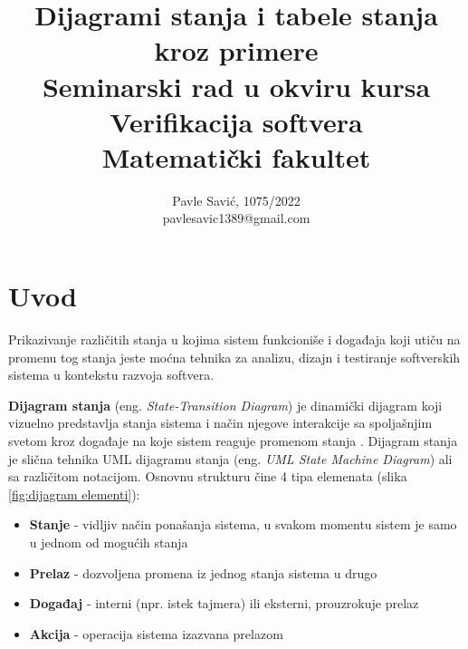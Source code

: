 \documentclass[a4paper]{article}
\begin{document}
\title{Dijagrami stanja i tabele stanja kroz primere\\ \small{Seminarski rad u okviru kursa\\Verifikacija softvera\\Matematički fakultet}}

\author{Pavle Savić, 1075/2022\\ pavlesavic1389@gmail.com}
\maketitle


\tableofcontents

\newpage

\section{Uvod}
\label{sec:uvod} Prikazivanje različitih stanja u kojima sistem funkcioniše i događaja koji utiču na promenu tog stanja jeste moćna tehnika za analizu, dizajn i testiranje softverskih sistema u kontekstu razvoja softvera. 

\textbf{Dijagram stanja} (eng. \textit{State-Transition Diagram}) je dinamički dijagram koji vizuelno predstavlja stanja sistema i način njegove interakcije sa spoljašnjim svetom kroz događaje na koje sistem reaguje promenom stanja \cite{StateTestingExample}. Dijagram stanja je slična tehnika UML dijagramu stanja (eng. \textit{UML State Machine Diagram}) ali sa različitom notacijom. Osnovnu strukturu čine 4 tipa elemenata (slika \ref{fig:dijagram elementi}):

\begin{itemize}
    \item \textbf{Stanje} - vidljiv način ponašanja sistema, u svakom momentu sistem je samo u jednom od mogućih stanja  
    \item \textbf{Prelaz} - dozvoljena promena iz jednog stanja sistema u drugo
    \item \textbf{Događaj} - interni (npr. istek tajmera) ili eksterni, prouzrokuje prelaz 
    \item \textbf{Akcija} - operacija sistema izazvana prelazom
\end{itemize}
\end{document}
